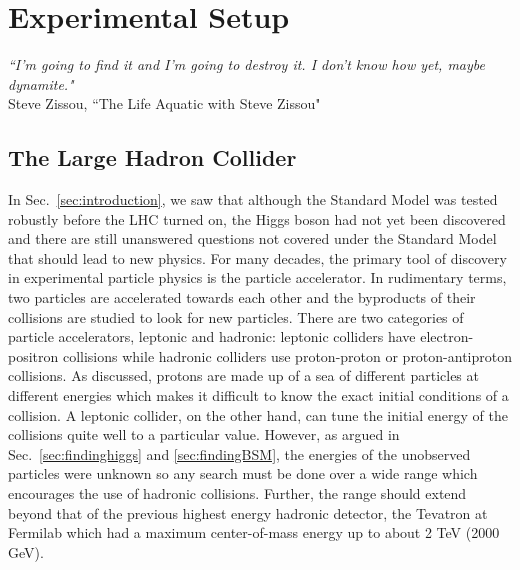 \chapter{Experimental Setup}
\label{sec:expt}

\begin{center}
\begin{footnotesize}
{\it{``I'm going to find it and I'm going to destroy it. I don't know how yet, maybe dynamite."}}\\
Steve Zissou, ``The Life Aquatic with Steve Zissou"
\end{footnotesize}
\end{center}

\section{The Large Hadron Collider}
\label{sec:LHC}

In Sec.~\ref{sec:introduction}, we saw that although the Standard Model was tested robustly before the LHC turned on, the Higgs boson had not yet been discovered and there are still unanswered questions not covered under the Standard Model that should lead to new physics. For many decades, the primary tool of discovery in experimental particle physics is the particle accelerator. In rudimentary terms, two particles are accelerated towards each other and the byproducts of their collisions are studied to look for new particles. There are two categories of particle accelerators, leptonic and hadronic: leptonic colliders have electron-positron collisions while hadronic colliders use proton-proton or proton-antiproton collisions. As discussed, protons are made up of a sea of different particles at different energies which makes it difficult to know the exact initial conditions of a collision. A leptonic collider, on the other hand, can tune the initial energy of the collisions quite well to a particular value. However, as argued in Sec.~\ref{sec:findinghiggs} and \ref{sec:findingBSM}, the energies of the unobserved particles were unknown so any search must be done over a wide range which encourages the use of hadronic collisions. Further, the range should extend beyond that of the previous highest energy hadronic detector, the Tevatron at Fermilab which had a maximum center-of-mass energy up to about 2 TeV (2000 GeV).

